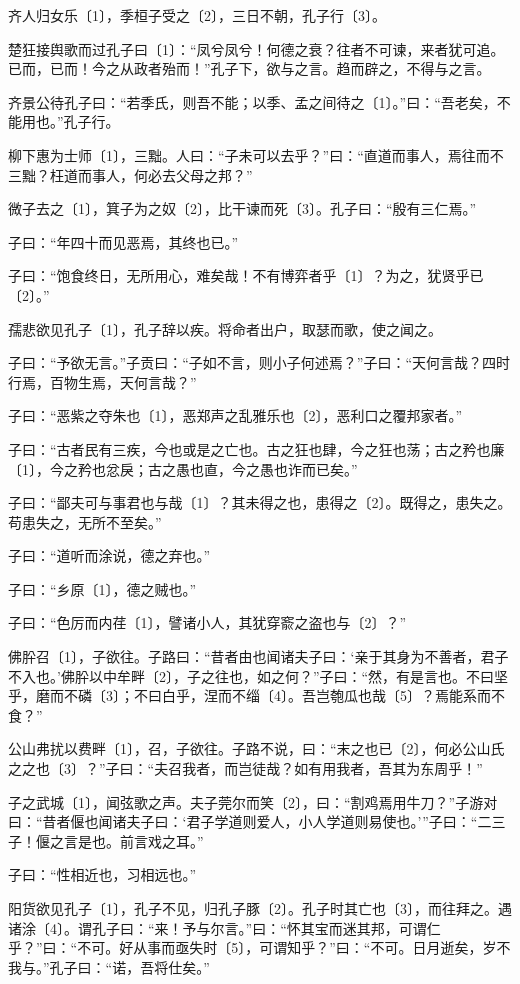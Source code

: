 \documentclass[a5paper]{ctexbook}
\begin{document}
    齐人归女乐〔1〕，季桓子受之〔2〕，三日不朝，孔子行〔3〕。

    楚狂接舆歌而过孔子曰〔1〕：“凤兮凤兮！何德之衰？往者不可谏，来者犹可追。已而，已而！今之从政者殆而！”孔子下，欲与之言。趋而辟之，不得与之言。

    齐景公待孔子曰：“若季氏，则吾不能；以季、孟之间待之〔1〕。”曰：“吾老矣，不能用也。”孔子行。

    柳下惠为士师〔1〕，三黜。人曰：“子未可以去乎？”曰：“直道而事人，焉往而不三黜？枉道而事人，何必去父母之邦？”

    微子去之〔1〕，箕子为之奴〔2〕，比干谏而死〔3〕。孔子曰：“殷有三仁焉。”

    子曰：“年四十而见恶焉，其终也已。”

    子曰：“饱食终日，无所用心，难矣哉！不有博弈者乎〔1〕？为之，犹贤乎已〔2〕。”

    孺悲欲见孔子〔1〕，孔子辞以疾。将命者出户，取瑟而歌，使之闻之。

    子曰：“予欲无言。”子贡曰：“子如不言，则小子何述焉？”子曰：“天何言哉？四时行焉，百物生焉，天何言哉？”

    子曰：“恶紫之夺朱也〔1〕，恶郑声之乱雅乐也〔2〕，恶利口之覆邦家者。”

    子曰：“古者民有三疾，今也或是之亡也。古之狂也肆，今之狂也荡；古之矜也廉〔1〕，今之矜也忿戾；古之愚也直，今之愚也诈而已矣。”

    子曰：“鄙夫可与事君也与哉〔1〕？其未得之也，患得之〔2〕。既得之，患失之。苟患失之，无所不至矣。”

    子曰：“道听而涂说，德之弃也。”

    子曰：“乡原〔1〕，德之贼也。”

    子曰：“色厉而内荏〔1〕，譬诸小人，其犹穿窬之盗也与〔2〕？”

    佛肸召〔1〕，子欲往。子路曰：“昔者由也闻诸夫子曰：‘亲于其身为不善者，君子不入也。’佛肸以中牟畔〔2〕，子之往也，如之何？”子曰：“然，有是言也。不曰坚乎，磨而不磷〔3〕；不曰白乎，涅而不缁〔4〕。吾岂匏瓜也哉〔5〕？焉能系而不食？”

    公山弗扰以费畔〔1〕，召，子欲往。子路不说，曰：“末之也已〔2〕，何必公山氏之之也〔3〕？”子曰：“夫召我者，而岂徒哉？如有用我者，吾其为东周乎！”

    子之武城〔1〕，闻弦歌之声。夫子莞尔而笑〔2〕，曰：“割鸡焉用牛刀？”子游对曰：“昔者偃也闻诸夫子曰：‘君子学道则爱人，小人学道则易使也。’”子曰：“二三子！偃之言是也。前言戏之耳。”

    子曰：“性相近也，习相远也。”

    阳货欲见孔子〔1〕，孔子不见，归孔子豚〔2〕。孔子时其亡也〔3〕，而往拜之。遇诸涂〔4〕。谓孔子曰：“来！予与尔言。”曰：“怀其宝而迷其邦，可谓仁乎？”曰：“不可。好从事而亟失时〔5〕，可谓知乎？”曰：“不可。日月逝矣，岁不我与。”孔子曰：“诺，吾将仕矣。”
\end{document}
